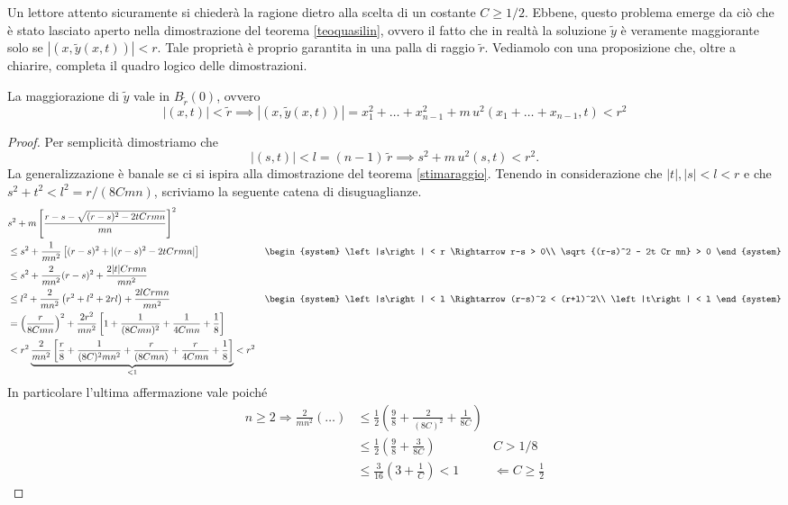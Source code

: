 Un lettore attento sicuramente si chiederà la ragione dietro alla scelta di un costante $C\geq 1/2$. Ebbene, questo problema emerge da ciò che è stato lasciato aperto nella dimostrazione del teorema \ref{teoquasilin}, ovvero il fatto che in realtà la soluzione $\widetilde{y}$ è veramente maggiorante solo se $|(x,\widetilde{y}(x,t))|< r$. Tale proprietà è proprio garantita in una palla di raggio $\widetilde{r}$. Vediamolo con una proposizione che, oltre a chiarire, completa il quadro logico delle dimostrazioni.
\begin{namedtheorem}[Proposizione]\label{prop}
La maggiorazione di $\widetilde{y}$ vale in $B_{\widetilde{r}}(0)$, ovvero
$$|(x,t)|<\widetilde{r} \implies |(x,\widetilde{y}(x,t))|=x_1^2 + \ldots + x_{n-1}^2 + m \, u^2(x_1 + \ldots + x_{n-1},t) < r^2$$
\end{namedtheorem}
\begin{proof}
Per semplicità dimostriamo che $$|(s,t)|< l=(n-1)\,\widetilde{r} \implies s^2 + m \, u^2(s,t) < r^2.$$ La generalizzazione è banale se ci si ispira alla dimostrazione del teorema \ref{stimaraggio}. 
\newpage
Tenendo in considerazione che $|t|,|s|<l<r$ e che $s^2+t^2<l^2=r/(8Cmn)$, scriviamo la seguente catena di disuguaglianze.
\begin{align*}
& s^2 + m \left[ \frac{r-s-\sqrt{(r-s)^2-2tCrmn}}{mn} \right]^2\\ 
&\leq s^2 + \frac{1}{mn^2} \left[ (r-s)^2 + |(r-s)^2-2tCrmn| \right] 
&\begin{system}
\left|s\right| < r \Rightarrow r-s > 0\\
 \sqrt{(r-s)^2 - 2t Cr mn} > 0 
\end{system}\\
&\leq s^2 + \frac{2}{mn^2} (r-s)^2 + \frac{2|t|Crmn}{mn^2} \\
&\leq l^2 + \frac{2}{mn^2} \left( r^2 + l^2 + 2rl \right) + \frac{2lCrmn}{mn^2} 
&\begin{system}
\left|s\right| < l \Rightarrow (r-s)^2 < (r+l)^2\\
\left|t\right| < l
\end{system}\\
&= \left( \frac{r}{8Cmn} \right)^2 + \frac{2r^2}{mn^2} \left[ 1+\frac{1}{(8Cmn)^2} + \frac{1}{4Cmn} + \frac{1}{8} \right] \\
&< r^2 \underbrace{\frac{2}{mn^2} \left[ \frac{r}{8} + \frac{1}{(8C)^2 mn^2} + \frac{r}{(8Cmn)} + \frac{r}{4Cmn} + \frac{1}{8} \right]}_{<1} < r^2 \\
\end{align*}
In particolare l'ultima affermazione vale poiché
\begin{align*}
n \geq 2 \Rightarrow \frac{2}{mn^2} \left(\ldots\right) 
&\leq \frac{1}{2} \left(\frac{9}{8} + \frac{2}{(8C)^2} + \frac{1}{8C}\right) \\
& \leq \frac{1}{2} \left(\frac{9}{8} + \frac{3}{8C}\right) & C>1/8\\
& \leq \frac{3}{16} \left(3 + \frac{1}{C}\right) < 1 & \Leftarrow C \geq \frac{1}{2} 
\end{align*}
\end{proof}


